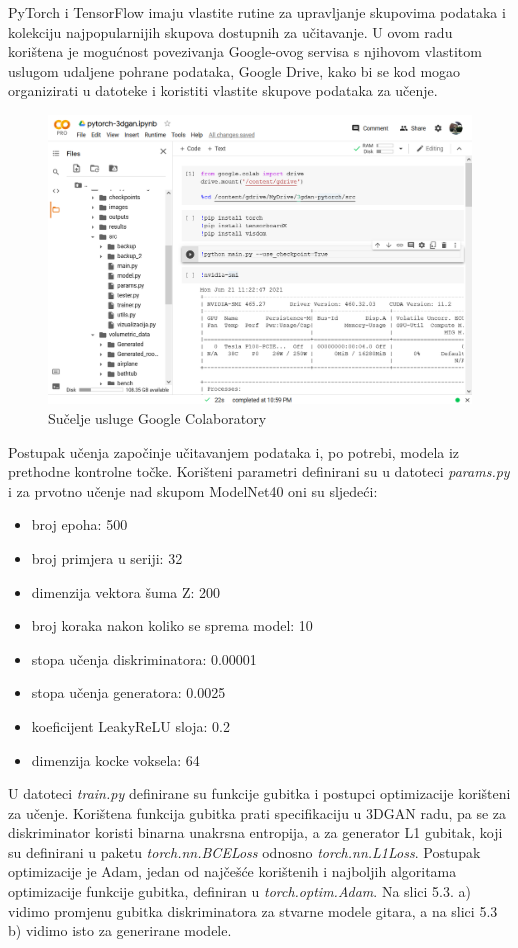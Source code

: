 \documentclass[times, utf8, diplomski]{fer}
\begin{document}
PyTorch i TensorFlow imaju vlastite rutine za upravljanje skupovima podataka i kolekciju najpopularnijih skupova dostupnih za učitavanje. U ovom radu korištena je mogućnost povezivanja Google-ovog servisa s njihovom vlastitom uslugom udaljene pohrane podataka, Google Drive, kako bi se kod mogao organizirati u datoteke i koristiti vlastite skupove podataka za učenje. 

\begin{figure}[h]
\centering
\includegraphics[scale=0.42]{colab_interface.png}
\caption{Sučelje usluge Google Colaboratory}
\end{figure}

Postupak učenja započinje učitavanjem podataka i, po potrebi, modela iz prethodne kontrolne točke. Korišteni parametri definirani su u datoteci \textit{params.py} i za prvotno učenje nad skupom ModelNet40 oni su sljedeći:
\begin{itemize}
    \item broj epoha: 500
    \item broj primjera u seriji: 32
    \item dimenzija vektora šuma Z: 200
    \item broj koraka nakon koliko se sprema model: 10
    \item stopa učenja diskriminatora: 0.00001
    \item stopa učenja generatora: 0.0025
    \item koeficijent LeakyReLU sloja: 0.2
    \item dimenzija kocke voksela: 64
\end{itemize}

U datoteci \textit{train.py} definirane su funkcije gubitka i postupci optimizacije korišteni za učenje. Korištena funkcija gubitka prati specifikaciju u 3DGAN radu, pa se za diskriminator koristi binarna unakrsna entropija, a za generator L1 gubitak, koji su definirani u paketu \textit{torch.nn.BCELoss} odnosno \textit{torch.nn.L1Loss}. Postupak optimizacije je Adam, jedan od najčešće korištenih i najboljih algoritama optimizacije funkcije gubitka, definiran u \textit{torch.optim.Adam}. Na slici 5.3. a) vidimo promjenu gubitka diskriminatora za stvarne modele gitara, a na slici 5.3 b) vidimo isto za generirane modele.
\end{document}
